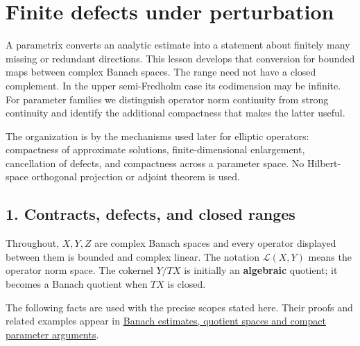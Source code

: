 \documentclass[
  11pt,
]{article}
\author{}
\date{}
\begin{document}
\section{Finite defects under
perturbation}\label{finite-defects-under-perturbation}

A parametrix converts an analytic estimate into a statement about
finitely many missing or redundant directions. This lesson develops that
conversion for bounded maps between complex Banach spaces. The range
need not have a closed complement. In the upper semi-Fredholm case its
codimension may be infinite. For parameter families we distinguish
operator norm continuity from strong continuity and identify the
additional compactness that makes the latter useful.

The organization is by the mechanisms used later for elliptic operators:
compactness of approximate solutions, finite-dimensional enlargement,
cancellation of defects, and compactness across a parameter space. No
Hilbert-space orthogonal projection or adjoint theorem is used.

\subsection{1. Contracts, defects, and closed
ranges}\label{contracts-defects-and-closed-ranges}

Throughout, \(X,Y,Z\) are complex Banach spaces and every operator
displayed between them is bounded and complex linear. The notation
\(\mathcal L(X,Y)\) means the operator norm space. The cokernel \(Y/TX\)
is initially an \textbf{algebraic} quotient; it becomes a Banach
quotient when \(TX\) is closed.

The following facts are used with the precise scopes stated here. Their
proofs and related examples appear in
\href{banach-foundation-bridges.pdf}{Banach estimates, quotient spaces
and compact parameter arguments}.
\end{document}
